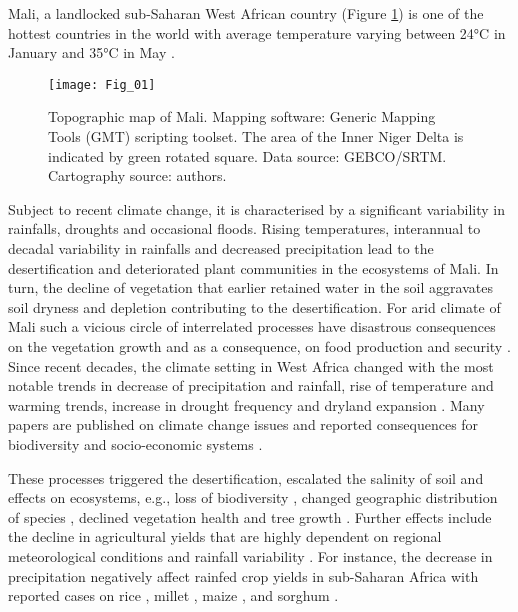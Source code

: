 \documentclass[12pt,a4paper,oneside]{article}
\def \newpar{\vspace{6pt}}
\begin{document}
\newpar Mali, a landlocked sub-Saharan West African country (Figure \ref{fig01}) is one of the hottest countries in the world with average temperature varying between 24°C in January and 35°C in May \citep{CCKP}. 

\begin{figure}[H]
\centering
	\texttt{[image: Fig\_01]}
	\vspace*{20pt}\caption{Topographic map of Mali. Mapping software: Generic Mapping Tools (GMT) scripting toolset. The area of the Inner Niger Delta is indicated by green rotated square. Data source: GEBCO/SRTM. Cartography source: authors.
	\label{fig01}}
\end{figure}

\newpar Subject to recent climate change, it is characterised by a significant variability in rainfalls, droughts and occasional floods. Rising temperatures, interannual to decadal variability in rainfalls and decreased precipitation lead to the desertification and deteriorated plant communities in the ecosystems of Mali. In turn, the decline of vegetation that earlier retained water in the soil aggravates soil dryness and depletion contributing to the desertification. For arid climate of Mali such a vicious circle of interrelated processes have disastrous consequences on the vegetation growth and as a consequence, on food production and security \citep{Davies1996}. Since recent decades, the climate setting in West Africa changed with the most notable trends in decrease of precipitation and rainfall, rise of temperature and warming trends, increase in drought frequency and dryland expansion \citep{LEALFILHO202283,OGUNTUNDE2017121,OGUNTUNDE20061180,SIDIBE2019141}. Many papers are published on climate change issues and reported consequences for biodiversity and socio-economic systems \citep{LEHOUEROU1996133,Huang,Yu}. 

\newpar These processes triggered the desertification, escalated the salinity of soil and effects on ecosystems, e.g., loss of biodiversity \citep{HEUBES201348}, changed geographic distribution of species \citep{COULIBALY2023100359}, declined vegetation health and tree growth \citep{SANOGO2022100333}. Further effects include the
decline in agricultural yields that are highly dependent on regional meteorological conditions and rainfall variability \citep{Zare}. For instance, the decrease in precipitation negatively affect rainfed crop yields in sub-Saharan Africa \citep{RAES2021108563,BAMBIO2022102288} with reported cases on rice \citep{AKPOTI2022103429,ADJAH2022512}, millet \citep{BADO2022107992}, maize \citep{SRIVASTAVA201610}, and sorghum \citep{ADAM2020102920}.
\end{document}
